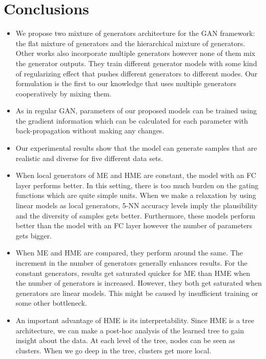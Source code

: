 \documentclass[a4paper,onesided,12pt]{report}
\begin{document}
\section{Conclusions}
\label{sec:conc}
\begin{itemize}
\item We propose two mixture of generators architecture for the GAN framework: the flat mixture of generators and the hierarchical mixture of generators. Other works also incorporate multiple generators however none of them mix the generator outputs. They train different generator models with some kind of regularizing effect that pushes different generators to different modes. Our formulation is the first to our knowledge that uses multiple generators cooperatively by mixing them. 
\item As in regular GAN, parameters of our proposed models can be trained using the gradient information which can be calculated for each parameter with back-propagation without making any changes.
\item Our experimental results show that the model can generate samples that are realistic and diverse for five different data sets.
\item When local generators of ME and HME are constant, the model with an FC layer performs better. In this setting, there is too much burden on the gating functions which are quite simple units. When we make a relaxation by using linear models as local generators, 5-NN accuracy levels imply the plausibility and the diversity of samples gets better. Furthermore, these models perform better than the model with an FC layer however the number of parameters gets bigger.
\item When ME and HME are compared, they perform around the same. The increment in the number of generators generally enhances results. For the constant generators, results get saturated quicker for ME than HME when the number of generators is increased. However, they both get saturated when generators are linear models. This might be caused by insufficient training or some other bottleneck.
\item An important advantage of HME is its interpretability. Since HME is a tree architecture, we can make a post-hoc analysis of the learned tree to gain insight about the data. At each level of the tree, nodes can be seen as clusters. When we go deep in the tree, clusters get more local.
\end{itemize}
\end{document}
